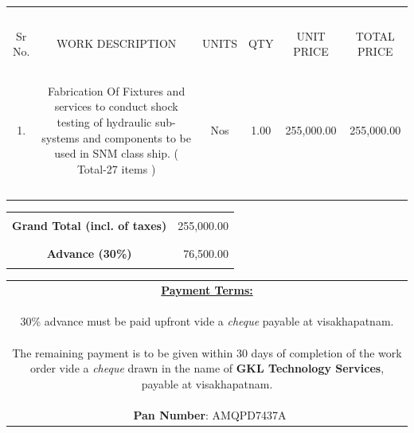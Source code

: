 \documentclass[11pt,a4]{article}
\begin{document}
{{\begin{center}
\begin{tabular}{|c|c|c|c|c|c|}
  \hline

 \ & & &  & &  \\

 Sr No. & WORK DESCRIPTION & UNITS & QTY & UNIT PRICE & TOTAL PRICE\\
 \hline\ & & &  & &  \\
 
  1.  &   \parbox{2.95in}{\footnotesize Fabrication Of Fixtures and services to conduct shock
testing of hydraulic sub-systems and components to be used in SNM class ship.
( Total-27 items ) }

 &   Nos & 1.00 & 255,000.00 & 255,000.00 \\

                                    
\ & & &  & &  \\
\hline

                                    
\end{tabular}
\end{center}
}


\hspace*{9.8cm}
\begin{tabular}{|c|r|}
\hline
& \\
{\bf Grand Total (incl. of taxes)} & 255,000.00 \\
& \\
\hline
& \\
{\bf Advance (30\%)} & 76,500.00\\
& \\
\hline
\end{tabular}

\vspace*{-2.2cm}
\noindent \hspace*{6mm} \begin{tabular}{c}
\parbox{3in}{  {\bf \underline{Payment Terms:}} \\ \\ 30\% advance must be paid upfront vide a {\em cheque} payable at visakhapatnam. \\  \ \\ The remaining payment is to be given within 30 days of completion of the work order vide a {\em cheque} drawn in the name of {\bf GKL Technology Services}, payable at visakhapatnam.  \\ \\\ {\noindent \bf Pan Number}:   AMQPD7437A }\\
\end{tabular}
\vspace*{25pt}


}
\end{document}
